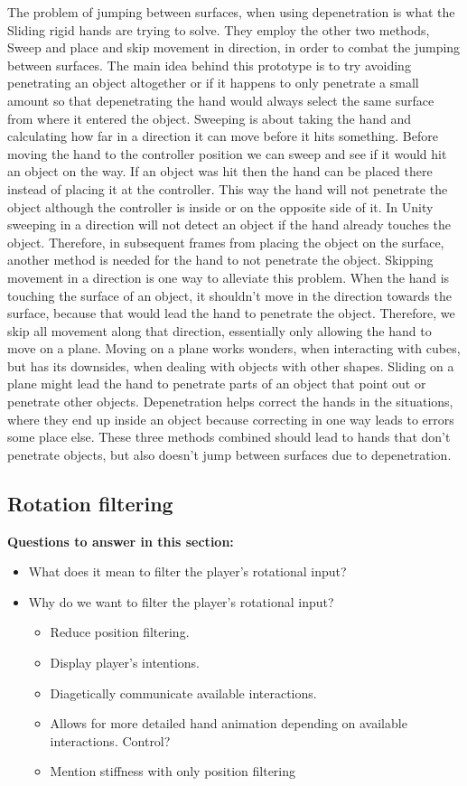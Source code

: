 The problem of jumping between surfaces, when using depenetration is what the Sliding rigid hands are trying to solve. They employ the other two methods, Sweep and place and skip movement in direction, in order to combat the jumping between surfaces. The main idea behind this prototype is to try avoiding penetrating an object altogether or if it happens to only penetrate a small amount so that depenetrating the hand would always select the same surface from where it entered the object. Sweeping is about taking the hand and calculating how far in a direction it can move before it hits something. Before moving the hand to the controller position we can sweep and see if it would hit an object on the way. If an object was hit then the hand can be placed there instead of placing it at the controller. This way the hand will not penetrate the object although the controller is inside or on the opposite side of it. In Unity sweeping in a direction will not detect an object if the hand already touches the object. Therefore, in subsequent frames from placing the object on the surface, another method is needed for the hand to not penetrate the object. Skipping movement in a direction is one way to alleviate this problem. When the hand is touching the surface of an object, it shouldn't move in the direction towards the surface, because that would lead the hand to penetrate the object. Therefore, we skip all movement along that direction, essentially only allowing the hand to move on a plane. Moving on a plane works wonders, when interacting with cubes, but has its downsides, when dealing with objects with other shapes. Sliding on a plane might lead the hand to penetrate parts of an object that point out or penetrate other objects. Depenetration helps correct the hands in the situations, where they end up inside an object because correcting in one way leads to errors some place else. These three methods combined should lead to hands that don't penetrate objects, but also doesn't jump between surfaces due to depenetration.


\subsection{Rotation filtering}
\label{subsec:categoryRotationFiltering}
\textbf{Questions to answer in this section:}
\begin{itemize}
\item What does it mean to filter the player's rotational input?
\item Why do we want to filter the player's rotational input?
\begin{itemize}
\item Reduce position filtering.
\item Display player's intentions.
\item Diagetically communicate available interactions.
\item Allows for more detailed hand animation depending on available interactions. Control?
\item Mention stiffness with only position filtering
\end{itemize}
\end{itemize}

